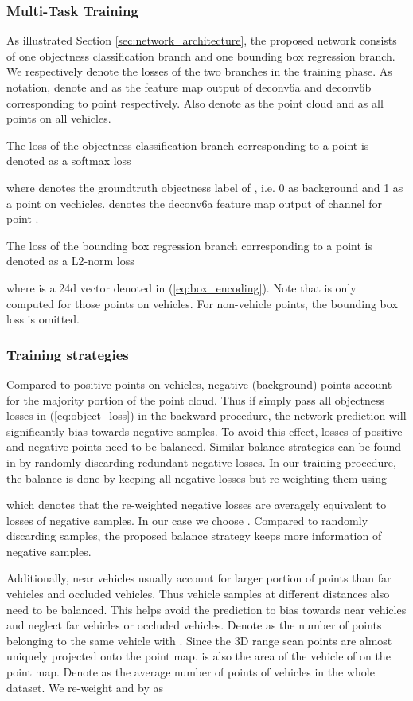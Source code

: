 \documentclass[conference]{IEEEtran}
\begin{document}
\subsubsection{Multi-Task Training}
As illustrated Section \ref{sec:network_architecture}, the proposed network consists of one objectness classification branch and one bounding box regression branch. We respectively denote the losses of the two branches in the training phase. As notation, denote  and  as the feature map output of deconv6a and deconv6b corresponding to point  respectively. Also denote  as the point cloud and  as all points on all vehicles.

The loss of the objectness classification branch corresponding to a point  is denoted as a softmax loss

where  denotes the groundtruth objectness label of , i.e. 0 as background and 1 as a point on vechicles.   denotes the deconv6a feature map output of channel  for point .

The loss of the bounding box regression branch corresponding to a point  is denoted as a L2-norm loss

where  is a 24d vector denoted in (\ref{eq:box_encoding}). Note that  is only computed for those points on vehicles. For non-vehicle points, the bounding box loss is omitted. 

\subsubsection{Training strategies}
Compared to positive points on vehicles, negative (background) points account for the majority portion of the point cloud. Thus if simply pass all objectness losses in (\ref{eq:object_loss}) in the backward procedure, the network prediction will significantly bias towards negative samples. To avoid this effect, losses of positive and negative points need to be balanced. Similar balance strategies can be found in \citet{Huang2015} by randomly discarding redundant negative losses. In our training procedure, the balance is done by keeping all negative losses but re-weighting them using

which denotes that the re-weighted negative losses are averagely equivalent to losses of  negative samples. In our case we choose . Compared to randomly discarding samples, the proposed balance strategy keeps more information of negative samples.

Additionally, near vehicles usually account for larger portion of points than far vehicles and occluded vehicles. Thus vehicle samples at different distances also need to be balanced. This helps avoid the prediction to bias towards near vehicles and neglect far vehicles or occluded vehicles. Denote  as the number of points belonging to the same vehicle with . Since the 3D range scan points are almost uniquely projected onto the point map.  is also the area of the vehicle of  on the point map. Denote  as the average number of points of vehicles in the whole dataset. We re-weight  and  by  as
\end{document}
